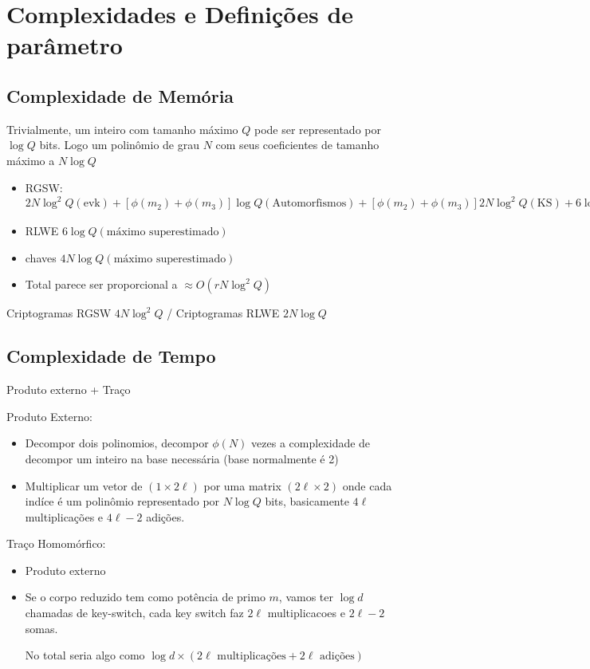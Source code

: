 \section{Complexidades e Definições de parâmetro}

\subsection{Complexidade de Memória}
Trivialmente, um inteiro com tamanho máximo $Q$ pode ser representado por $\log Q$ bits. Logo um polinômio de grau $N$ com seus coeficientes de tamanho 
máximo a $N \log Q$

\begin{itemize}
    \item RGSW: $2N \log^2 Q (\text{evk}) + [\phi(m_2) + \phi(m_3)] \log Q (\text{Automorfismos}) + [\phi(m_2) + \phi(m_3)] 2 N \log^2 Q (\text{KS}) + 
    6 \log Q (\text{máximo superestimado}) \approx O(r N \log^2 Q)$
    \item RLWE $6 \log Q (\text{máximo superestimado})$
    \item chaves $4 N \log Q (\text{máximo superestimado})$
    \item Total parece ser proporcional a $\approx O(r N \log^2 Q)$
\end{itemize}

Criptogramas RGSW $4 N \log^2 Q$ / Criptogramas RLWE $2N \log Q$

\subsection{Complexidade de Tempo}

Produto externo + Traço

    
Produto Externo:
\begin{itemize}
    \item Decompor dois polinomios, decompor $\phi(N)$ vezes a complexidade de decompor um inteiro na base necessária (base normalmente é 2) 
    \item Multiplicar um vetor de $(1 \times 2\ell)$ por uma matrix $(2\ell \times 2)$ onde cada indíce é um polinômio representado por $N \log Q$ bits,
    basicamente $4 \ell$ multiplicações e $4\ell - 2$ adições.
\end{itemize}

Traço Homomórfico:
\begin{itemize}
    \item Produto externo
    \item Se o corpo reduzido tem como potência de primo $m$, vamos ter $\log d$ chamadas de key-switch, cada key switch faz $2\ell$ multiplicacoes e $2\ell - 2$ somas.
    
    No total seria algo como $\log d \times (2 \ell \text{ multiplicações} + 2 \ell \text{ adições}) $
\end{itemize}